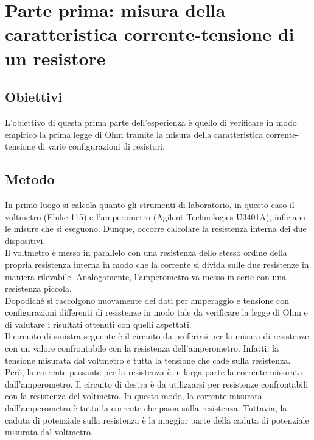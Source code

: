 \documentclass[a4paper]{article}
\begin{document}
\section{Parte prima: misura della caratteristica corrente-tensione di un resistore}
\subsection{Obiettivi}
L'obiettivo di questa prima parte dell'esperienza è quello di verificare in modo empirico la prima legge di Ohm tramite la misura della caratteristica corrente-tensione di varie configurazioni di resistori.

\subsection{Metodo}
In primo luogo si calcola quanto gli strumenti di laboratorio, in questo caso il voltmetro (Fluke 115) e l'amperometro (Agilent Technologies U3401A), inficiano le misure che si eseguono. Dunque, occorre calcolare la resistenza interna dei due dispositivi.\\
Il voltmetro è messo in parallelo con una resistenza dello stesso ordine della propria resistenza interna in modo che la corrente si divida sulle due resistenze in maniera rilevabile. Analogamente, l'amperometro va messo in serie con una resistenza piccola.\\
Dopodiché si raccolgono nuovamente dei dati per amperaggio e tensione con configurazioni differenti di resistenze in modo tale da verificare la legge di Ohm e di valutare i risultati ottenuti con quelli aspettati.\\
Il circuito di sinistra seguente è il circuito da preferirsi per la misura di resistenze con un valore confrontabile con la resistenza dell'amperometro. Infatti, la tensione misurata dal voltmetro è tutta la tensione che cade sulla resistenza. Però, la corrente passante per la resistenza è in larga parte la corrente misurata dall'amperometro.
Il circuito di destra è da utilizzarsi per resistenze confrontabili con la resistenza del voltmetro. In questo modo, la corrente misurata dall'amperometro è tutta la corrente che passa sulla resistenza. Tuttavia, la caduta di potenziale sulla resistenza è la maggior parte della caduta di potenziale misurata dal voltmetro.
\end{document}
